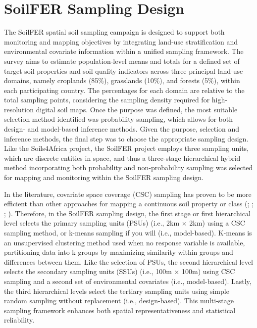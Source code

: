 \documentclass[
  10pt,
  b5paper,
  oneside]{book}
\begin{document}
\section{SoilFER Sampling Design}\label{soilfer-design}

The SoilFER spatial soil sampling campaign is designed to support both monitoring and mapping objectives by integrating land-use stratification and environmental covariate information within a unified sampling framework. The survey aims to estimate population-level means and totals for a defined set of target soil properties and soil quality indicators across three principal land-use domains, namely croplands (85\%), grasslands (10\%), and forests (5\%), within each participating country. The percentages for each domain are relative to the total sampling points, considering the sampling density required for high-resolution digital soil maps. Once the purpose was defined, the most suitable selection method identified was probability sampling, which allows for both design- and model-based inference methods. Given the purpose, selection and inference methods, the final step was to choose the appropriate sampling design. Like the Soils4Africa project, the SoilFER project employs three sampling units, which are discrete entities in space, and thus a three-stage hierarchical hybrid method incorporating both probability and non-probability sampling was selected for mapping and monitoring within the SoilFER sampling design.

In the literature, covariate space coverage (CSC) sampling has proven to be more efficient than other approaches for mapping a continuous soil property or class (; ; ; ). Therefore, in the SoilFER sampling design, the first stage or first hierarchical level selects the primary sampling units (PSUs) (i.e., 2km × 2km) using a CSC sampling method, or k-means sampling if you will (i.e., model-based). K-means is an unsupervised clustering method used when no response variable is available, partitioning data into k groups by maximizing similarity within groups and differences between them. Like the selection of PSUs, the second hierarchical level selects the secondary sampling units (SSUs) (i.e., 100m × 100m) using CSC sampling and a second set of environmental covariates (i.e., model-based). Lastly, the third hierarchical levels select the tertiary sampling units using simple random sampling without replacement (i.e., design-based). This multi-stage sampling framework enhances both spatial representativeness and statistical reliability.
\end{document}
